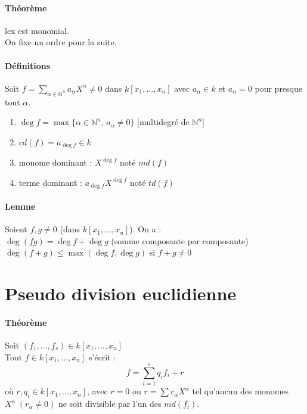 \documentclass[12pt,a4paper]{report}
\begin{document}
\paragraph{Théorème\\}
lex est monomial. \\

On fixe un ordre pour la suite.
\paragraph{Définitions\\}
Soit $f = \sum\limits_{\alpha \in \mathbb{N}^n} a_{\alpha} X^{\alpha} \neq 0 $ dans $k[x_1,\ldots,x_n]$ avec $a_{\alpha} \in k$ et $a_{\alpha} = 0$ pour presque tout $\alpha$.
\begin{enumerate}
\item $ \deg f = \max\{\alpha \in \mathbb{N}^n,\, a_{\alpha} \neq 0\} $ [multidegré de $\mathbb{N}^n$]
\item $ cd(f) = a_{\deg f} \in k $
\item monome dominant : $X^{\deg f}$ noté $md(f)$
\item terme dominant : $a_{\deg f} X^{\deg f}$ noté $td(f)$
\end{enumerate}
\paragraph{Lemme\\}
Soient $f,g \neq 0$ (dans $k[x_1,\ldots,x_n]$). On a :\\
$ \deg (fg) = \deg f + \deg g $ (somme composante par composante)\\
$ \deg (f+g) \leqslant \max (\deg f, \deg g)$ si $f+g \neq 0$
\section{Pseudo division euclidienne}
\paragraph{Théorème\\}
Soit $(f_1,\ldots,f_s) \in k[x_1,\ldots,x_n]$\\
Tout $f\in k[x_1,\ldots,x_n]$ s'écrit :
$$ f = \sum_{i=1}^s q_if_i + r $$
où $r,q_i \in k[x_1,\ldots,x_n]$, avec $r=0$ ou $r=\sum r_{\alpha}X^{\alpha}$ tel qu'aucun des monomes $X^{\alpha}\  (r_{\alpha}\neq 0)$ ne soit divisible par l'un des $md(f_i)$.
\end{document}

